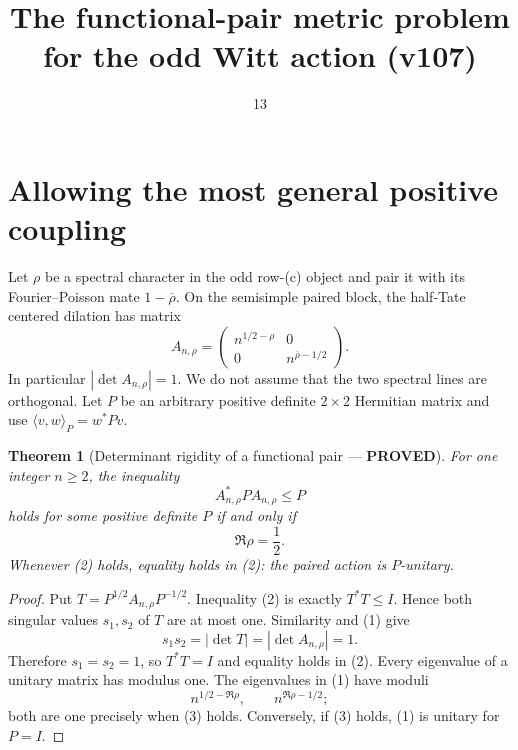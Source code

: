 \documentclass[11pt]{article}
\title{The functional-pair metric problem for the odd Witt action (v107)}
\date{13}
\newcommand{\PROVED}{\textcolor{green!40!black}{\textbf{PROVED}}}
\newtheorem{theorem}{Theorem}
\begin{document}
\maketitle

\section{Allowing the most general positive coupling}

Let $\rho$ be a spectral character in the odd row-(c) object and pair it
with its Fourier--Poisson mate $1-\overline\rho$.  On the semisimple paired
block, the half-Tate centered dilation has matrix
\begin{equation}
 A_{n,\rho}=
 \begin{pmatrix}
 n^{1/2-\rho}&0\\
 0&n^{\overline\rho-1/2}
 \end{pmatrix}.                                                \tag{1}
\end{equation}
In particular $|\det A_{n,\rho}|=1$.  We do not assume that the two
spectral lines are orthogonal.  Let $P$ be an arbitrary positive definite
$2\times2$ Hermitian matrix and use
$\langle v,w\rangle_P=w^*Pv$.

\begin{theorem}[Determinant rigidity of a functional pair --- \PROVED]
For one integer $n\ge2$, the inequality
\begin{equation}
                       A_{n,\rho}^*PA_{n,\rho}\le P            \tag{2}
\end{equation}
holds for some positive definite $P$ if and only if
\begin{equation}
                         \Re\rho=\frac12.                       \tag{3}
\end{equation}
Whenever (2) holds, equality holds in (2): the paired action is $P$-unitary.
\end{theorem}

\begin{proof}
Put $T=P^{1/2}A_{n,\rho}P^{-1/2}$.  Inequality (2) is exactly
$T^*T\le I$.  Hence both singular values $s_1,s_2$ of $T$ are at most one.
Similarity and (1) give
\[
 s_1s_2=|\det T|=|\det A_{n,\rho}|=1.
\]
Therefore $s_1=s_2=1$, so $T^*T=I$ and equality holds in (2).  Every
eigenvalue of a unitary matrix has modulus one.  The eigenvalues in (1)
have moduli
\[
 n^{1/2-\Re\rho},\qquad n^{\Re\rho-1/2};
\]
both are one precisely when (3) holds.  Conversely, if (3) holds, (1) is
unitary for $P=I$.
\end{proof}
\end{document}
